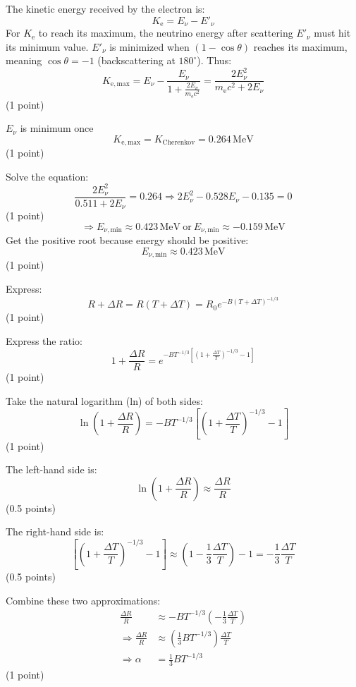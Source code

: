 \begin{description}
  The kinetic energy received by the electron is:
  \[ K_{\mathrm{e}} = E_\nu - E'_\nu \]
  For $K_{\mathrm{e}}$ to reach its maximum, the neutrino energy after
  scattering $E'_\nu$ must hit its minimum value. $E'_\nu$ is minimized when
  $(1 - \cos\theta)$ reaches its maximum, meaning $\cos\theta = -1$
  (backscattering at $180^\circ$). Thus:
  \[ K_{\mathrm{e,max}} = E_\nu - \frac{E_\nu}{1 + \frac{2E_\nu}{m_{\mathrm{e}}c^2}}
     = \frac{2E_\nu^2}{m_{\mathrm{e}}c^2 + 2E_\nu} \]
  \hfill(1 point)

  $E_\nu$ is minimum once
  \[ K_{\mathrm{e,max}} = K_{\mathrm{Cherenkov}} = 0.264\,\mathrm{MeV} \]
  \hfill(1 point)

  Solve the equation:
  \[ \frac{2E_\nu^2}{0.511 + 2E_\nu} = 0.264
     \Longrightarrow 2E_\nu^2 - 0.528E_\nu - 0.135 = 0 \]
  \hfill(1 point)
  \[ \Longrightarrow E_{\nu,\mathrm{min}} \approx 0.423\,\mathrm{MeV}
     \ \text{or}\ E_{\nu,\mathrm{min}} \approx -0.159\,\mathrm{MeV} \]
  Get the positive root because energy should be positive:
  \[ E_{\nu,\mathrm{min}} \approx 0.423\,\mathrm{MeV} \]
  \hfill(1 point)

\item[(c)] Express:
  \[ R + \Delta R = R(T + \Delta T) = R_0 e^{-B(T + \Delta T)^{-1/3}} \]
  \hfill(1 point)

  Express the ratio:
  \[ 1 + \frac{\Delta R}{R}
     = e^{-BT^{-1/3}\left[\left(1 + \frac{\Delta T}{T}\right)^{-1/3} - 1\right]} \]
  \hfill(1 point)

  Take the natural logarithm (ln) of both sides:
  \[ \ln\left(1 + \frac{\Delta R}{R}\right)
     = -BT^{-1/3}\left[\left(1 + \frac{\Delta T}{T}\right)^{-1/3} - 1\right] \]
  \hfill(1 point)

  The left-hand side is:
  \[ \ln\left(1 + \frac{\Delta R}{R}\right) \approx \frac{\Delta R}{R} \]
  \hfill(0.5 points)

  The right-hand side is:
  \[ \left[\left(1 + \frac{\Delta T}{T}\right)^{-1/3} - 1\right]
     \approx \left(1 - \frac{1}{3}\frac{\Delta T}{T}\right) - 1
     = -\frac{1}{3}\frac{\Delta T}{T} \]
  \hfill(0.5 points)

  Combine these two approximations:
  \begin{align*}
    \frac{\Delta R}{R} &\approx -BT^{-1/3}\left(-\frac{1}{3}\frac{\Delta T}{T}\right) \\
    \Longrightarrow \frac{\Delta R}{R}
      &\approx \left(\frac{1}{3}BT^{-1/3}\right)\frac{\Delta T}{T} \\
    \Longrightarrow \alpha &= \frac{1}{3}BT^{-1/3}
  \end{align*}
  \hfill(1 point)


\end{description}
